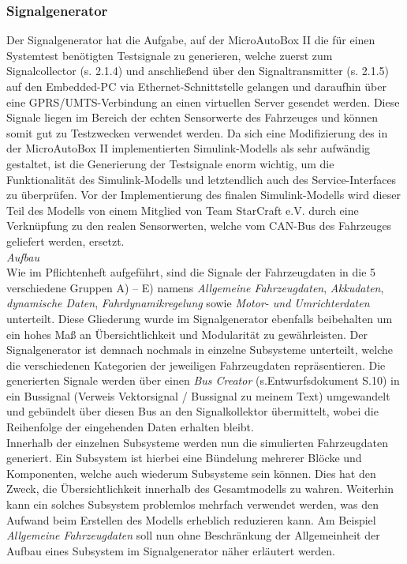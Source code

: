 \documentclass[fontsize = 12pt, paper = a4]{scrreprt}
\begin{document}
\subsubsection{Signalgenerator}


Der Signalgenerator hat die Aufgabe, auf der MicroAutoBox II die für einen Systemtest benötigten Testsignale zu generieren, welche zuerst zum Signalcollector (s. 2.1.4) und anschließend über den  Signaltransmitter (s. 2.1.5)  auf den Embedded-PC via Ethernet-Schnittstelle gelangen und daraufhin über eine GPRS/UMTS-Verbindung an einen virtuellen Server gesendet werden. Diese Signale liegen im Bereich der echten Sensorwerte des Fahrzeuges und können somit gut zu Testzwecken verwendet werden. Da sich eine Modifizierung des in der MicroAutoBox II implementierten Simulink-Modells als sehr aufwändig gestaltet, ist die Generierung der Testsignale enorm wichtig, um die Funktionalität des Simulink-Modells und letztendlich auch des Service-Interfaces zu überprüfen. Vor der Implementierung des finalen Simulink-Modells wird dieser Teil des Modells von einem Mitglied von Team StarCraft e.V. durch eine Verknüpfung zu den realen Sensorwerten, welche vom CAN-Bus des Fahrzeuges geliefert werden, ersetzt. \\

\textit{Aufbau} \\

Wie im Pflichtenheft aufgeführt, sind die Signale der Fahrzeugdaten in die 5 verschiedene Gruppen A) -- E) namens \textit{Allgemeine Fahrzeugdaten}, \textit{Akkudaten}, \textit{dynamische Daten}, \textit{Fahrdynamikregelung} sowie \textit{Motor- und Umrichterdaten} unterteilt. Diese Gliederung wurde im Signalgenerator ebenfalls beibehalten um ein hohes Maß an Übersichtlichkeit und Modularität zu gewährleisten. Der Signalgenerator ist demnach nochmals in einzelne Subsysteme unterteilt, welche die verschiedenen Kategorien der jeweiligen Fahrzeugdaten repräsentieren. Die generierten Signale werden über einen \textit{Bus Creator} (s.Entwurfsdokument S.10) in ein Bussignal (Verweis Vektorsignal / Bussignal zu meinem Text) umgewandelt und gebündelt über diesen Bus an den Signalkollektor übermittelt, wobei die Reihenfolge der eingehenden Daten erhalten bleibt. \\

Innerhalb der einzelnen Subsysteme werden nun die simulierten Fahrzeugdaten generiert. Ein Subsystem ist hierbei eine Bündelung mehrerer Blöcke und Komponenten, welche auch wiederum Subsysteme sein können. Dies hat den Zweck, die Übersichtlichkeit innerhalb des Gesamtmodells zu wahren. Weiterhin kann ein solches Subsystem problemlos mehrfach verwendet werden, was den Aufwand beim Erstellen des Modells erheblich reduzieren kann. Am Beispiel \textit{Allgemeine Fahrzeugdaten} soll nun ohne Beschränkung der Allgemeinheit der Aufbau eines Subsystem im Signalgenerator näher erläutert werden.
\end{document}
